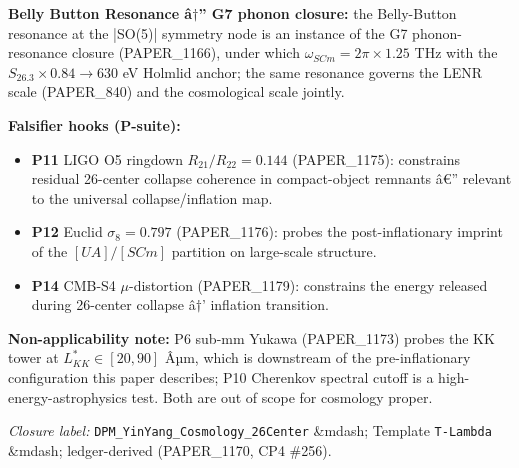 \documentclass[12pt,a4paper]{article}
\begin{document}
\textbf{Belly Button Resonance â$\dagger$'' G7 phonon closure:} the Belly-Button resonance at the |SO(5)| symmetry node is an instance of the G7 phonon-resonance closure (PAPER\_1166), under which $\omega_{SCm} = 2\pi\times1.25$ THz with the $S_{26.3}\times0.84\to 630$ eV Holmlid anchor; the same resonance governs the LENR scale (PAPER\_840) and the cosmological scale jointly.

\textbf{Falsifier hooks (P-suite):}

\begin{itemize}
  \item \textbf{P11} LIGO O5 ringdown $R_{21}/R_{22}=0.144$ (PAPER\_1175): constrains residual 26-center collapse coherence in compact-object remnants â€'' relevant to the universal collapse/inflation map.
  \item \textbf{P12} Euclid $\sigma_8=0.797$ (PAPER\_1176): probes the post-inflationary imprint of the $[UA]/[SCm]$ partition on large-scale structure.
  \item \textbf{P14} CMB-S4 $\mu$-distortion (PAPER\_1179): constrains the energy released during 26-center collapse â$\dagger$' inflation transition.
\end{itemize}

\textbf{Non-applicability note:} P6 sub-mm Yukawa (PAPER\_1173) probes the KK tower at $L_{KK}^{*} \in [20,90]$ Âµm, which is downstream of the pre-inflationary configuration this paper describes; P10 Cherenkov spectral cutoff is a high-energy-astrophysics test. Both are out of scope for cosmology proper.

\emph{Closure label:} \texttt{DPM\_YinYang\_Cosmology\_26Center} \&mdash; Template \texttt{T-Lambda} \&mdash; ledger-derived (PAPER\_1170, CP4 \#256).
\end{document}
